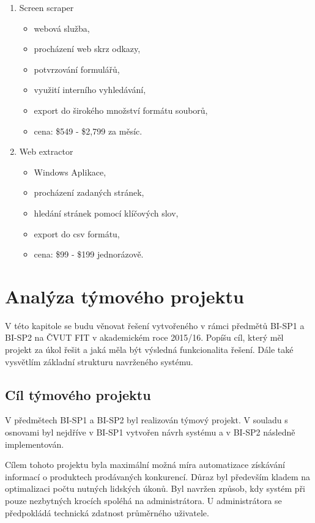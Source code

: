 \documentclass[thesis=B,czech]{FITthesis}[2012/06/26]
\begin{document}
\begin{enumerate}
\item Screen scraper \cite{ScreenScraper}

  \begin{itemize}
    \item webová služba,
    \item procházení web skrz odkazy,
    \item potvrzování formulářů,
    \item využití interního vyhledávání,
    \item export do širokého množství formátu souborů,
    \item cena: \$549 - \$2,799 za měsíc.
  \end{itemize}
  
\item Web extractor \cite{WebExtractor}

  \begin{itemize}
    \item Windows Aplikace,
    \item procházení zadaných stránek,
    \item hledání stránek pomocí klíčových slov,
    \item export do csv formátu,
    \item cena: \$99 - \$199 jednorázově.
  \end{itemize}


\end{enumerate}

\newpage

\chapter{Analýza týmového projektu}
V této kapitole se budu věnovat řešení vytvořeného v rámci předmětů BI-SP1 a BI-SP2 na ČVUT FIT v akademickém roce 2015/16.
Popíšu cíl, který měl projekt za úkol řešit a jaká měla být výsledná funkcionalita řešení. Dále také vysvětlím základní strukturu
navrženého systému.

\section{Cíl týmového projektu}

V předmětech BI-SP1 a BI-SP2 byl realizován týmový projekt. V souladu s osnovami byl nejdříve v BI-SP1 vytvořen návrh
systému a v BI-SP2 následně implementován.
\par
Cílem tohoto projektu byla maximální možná míra automatizace získávání informací o produktech prodávaných konkurencí. Důraz byl především kladem na optimalizaci počtu nutných lidských úkonů. Byl navržen způsob, kdy systém při pouze nezbytných krocích spoléhá na administrátora.
U administrátora se předpokládá technická zdatnost průměrného uživatele.
\par
\end{document}
